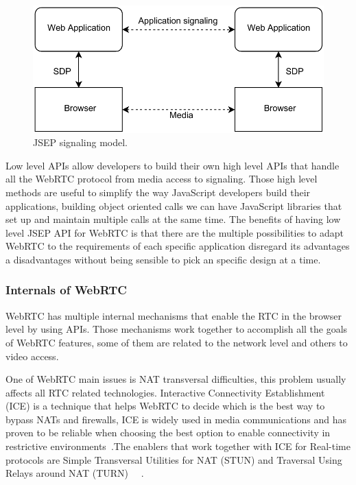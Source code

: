  \begin{figure}[h]
  \centering
    \includegraphics[scale=0.9]{./figures/JSEP.pdf}
      \caption[JSEP signaling model]{JSEP signaling model.}
	\label{fig:JSEP}
\end{figure}

Low level APIs allow developers to build their own high level APIs that handle all the WebRTC protocol from media access to signaling. Those high level methods are useful to simplify the way JavaScript developers build their applications, building object oriented calls we can have JavaScript libraries that set up and maintain multiple calls at the same time. The benefits of having low level JSEP API for WebRTC is that there are the multiple possibilities to adapt WebRTC to the requirements of each specific application disregard its advantages a disadvantages without being sensible to pick an specific design at a time.


\subsubsection{Internals of WebRTC}
\label{sec:internals}

WebRTC has multiple internal mechanisms that enable the RTC in the browser level by using APIs. Those mechanisms work together to accomplish all the goals of WebRTC features, some of them are related to the network level and others to video access.

One of WebRTC main issues is NAT transversal difficulties, this problem usually affects all RTC related technologies. Interactive Connectivity Establishment (ICE)  is a technique that helps WebRTC to decide which is the best way to bypass NATs and firewalls, ICE is widely used in media communications and has proven to be reliable when choosing the best option to enable connectivity in restrictive environments~\cite{iceIETF}.The enablers that work together with ICE for Real-time protocols are Simple Transversal Utilities for NAT (STUN)  and Traversal Using Relays around NAT (TURN) ~\cite{stunIETF}~\cite{turnIETF}.

